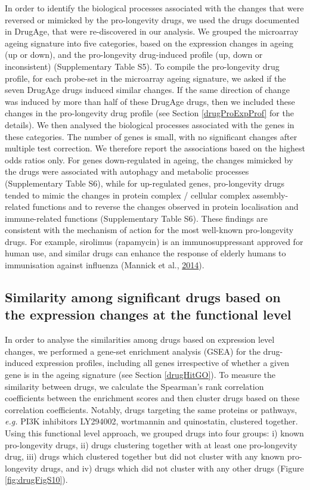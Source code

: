 \documentclass[12pt,twoside]{unicam}
\begin{document}
In order to identify the biological processes associated with the changes that were reversed or mimicked by the pro-longevity drugs, we used the drugs documented in DrugAge, that were re-discovered in our analysis. We grouped the microarray ageing signature into five categories, based on the expression changes in ageing (up or down), and the pro-longevity drug-induced profile (up, down or inconsistent) (Supplementary Table S5). To compile the pro-longevity drug profile, for each probe-set in the microarray ageing signature, we asked if the seven DrugAge drugs induced similar changes. If the same direction of change was induced by more than half of these DrugAge drugs, then we included these changes in the pro-longevity drug profile (see Section \ref{drugProExpProf} for the details). We then analysed the biological processes associated with the genes in these categories. The number of genes is small, with no significant changes after multiple test correction. We therefore report the associations based on the highest odds ratios only. For genes down-regulated in ageing, the changes mimicked by the drugs were associated with autophagy and metabolic processes (Supplementary Table S6), while for up-regulated genes, pro-longevity drugs tended to mimic the changes in protein complex / cellular complex assembly-related functions and to reverse the changes observed in protein localisation and immune-related functions (Supplementary Table S6). These findings are consistent with the mechanism of action for the most well-known pro-longevity drugs. For example, sirolimus (rapamycin) is an immunosuppressant approved for human use, and similar drugs can enhance the response of elderly humans to immunisation against influenza (Mannick et al., \protect\hyperlink{ref-Mannick2014}{2014}).

\hypertarget{similarity-among-significant-drugs-based-on-the-expression-changes-at-the-functional-level}{%
\subsection{Similarity among significant drugs based on the expression changes at the functional level}\label{similarity-among-significant-drugs-based-on-the-expression-changes-at-the-functional-level}}

In order to analyse the similarities among drugs based on expression level changes, we performed a gene-set enrichment analysis (GSEA) for the drug-induced expression profiles, including all genes irrespective of whether a given gene is in the ageing signature (see Section \ref{drugHitGO}). To measure the similarity between drugs, we calculate the Spearman's rank correlation coefficients between the enrichment scores and then cluster drugs based on these correlation coefficients. Notably, drugs targeting the same proteins or pathways, \emph{e.g.} PI3K inhibitors LY294002, wortmannin and quinostatin, clustered together. Using this functional level approach, we grouped drugs into four groups: i) known pro-longevity drugs, ii) drugs clustering together with at least one pro-longevity drug, iii) drugs which clustered together but did not cluster with any known pro-longevity drugs, and iv) drugs which did not cluster with any other drugs (Figure \ref{fig:drugFigS10}).
\end{document}
